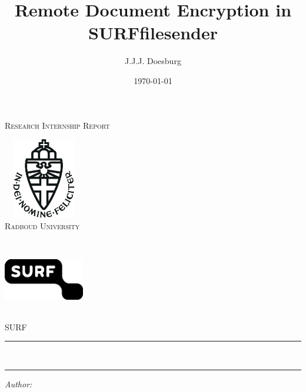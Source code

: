 \documentclass[a4paper]{report}
\author{J.J.J. Doesburg}
\title{Remote Document Encryption in SURFfilesender}
\date{\today}
\begin{document}
    \begin{titlepage}
        \parskip=0pt
        \begin{center}
            \textsc{\LARGE Research Internship Report}\\[1.5cm]

            \begin{minipage}[t]{0.45\textwidth}
                \centering
                \includegraphics[width=100pt, height=100pt, keepaspectratio]{imgs/logo-ru}\\[0.4cm]
                \vspace{0.4cm}
                \textsc{\Large Radboud University}\\[1cm]
            \end{minipage}
            \begin{minipage}[t]{0.45\textwidth}
                \centering
                \includegraphics[width=100pt, height=100pt, keepaspectratio]{imgs/logo-surf}\\[0.4cm]
                \vspace{0.4cm}
                \textsc{\Large SURF}\\[1cm]
            \end{minipage}
            \vspace{1.4cm}
            \hrule
            \vspace{0.4cm}
            \textbf{\huge \thetitle}\\[0.4cm]
            \hrule
            \vspace{2cm}
            \begin{minipage}[t]{0.45\textwidth}
                \begin{flushleft} \large
                \textit{Author:}\\
                \theauthor\\

\end{flushleft}
\end{minipage}
\end{center}
\end{titlepage}
\end{document}

